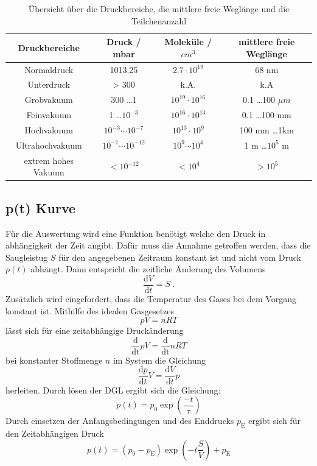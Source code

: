 \begin{table}
  \centering
  \caption{Übersicht über die Druckbereiche, die mittlere freie Weglänge und die Teilchenanzahl}
  \begin{tabular}{c|c c c}
  	\toprule
	Druckbereiche & Druck / mbar & Moleküle / $cm^3$ & mittlere freie Weglänge \\
	\midrule
	Normaldruck	& 1013.25			& $2.7 \cdot 10^{19}$ &	68 nm \\
	Unterdruck	& > 300				& k.A. & k.A \\
	Grobvakuum	& 300 \ldots 1 			&$10^{19} \cdot 10^{16}$&0.1 \ldots 100 $\mu m$ \\
	Feinvakuum	& 1 \ldots $10^{-3}$		& $10^{16} \cdot 10^{13}$ & 0.1 \ldots 100 mm \\
	Hochvakuum	& $10^{-3} \cdots 10^{-7}$	& $10^{13} \cdot 10^{9}$ & 100 mm \ldots 1km \\
	Ultrahochvakuum	& $10^{-7} \cdots 10^{-12}$	& $10^9 \cdots 10^4$ & 1 m \ldots $10^5$ m \\
	extrem hohes Vakuum & $< 10^{-12}$		& $<10^4$ & $> 10^5$ \\
	\bottomrule
  \end{tabular}
  \label{tab:ueberblick}
\end{table}
\subsection{p(t) Kurve}
Für die Auswertung wird eine Funktion benötigt welche den Druck in abhängigkeit der Zeit angibt. Dafür muss die Annahme getroffen werden, dass die Saugleistug $S$ für den angegebenen Zeitraum konstant ist und nicht vom Druck $p(t)$ abhängt. Dann entspricht die zeitliche Änderung des Volumens
\begin{equation}
  \frac{\text{d}V}{\text{d}t} = S \ .
\end{equation}
Zusätzlich wird eingefordert, dass die Temperatur des Gases bei dem Vorgang konstant ist. Mithilfe des idealen Gasgesetzes
\begin{equation}
  p V = n R T
\end{equation}
lässt sich für eine zeitabhängige Druckänderung
\begin{equation}
  \frac{\text{d}}{\text{dt}} pV = \frac{\text{d}}{\text{dt}} n R T
\end{equation}
bei konstanter Stoffmenge $n$ im System die Gleichung
\begin{equation}
  \frac{\text{d}p}{\text{d}t} V= \frac{\text{d}V}{\text{d}t} p
  \label{eqn:konti}
\end{equation}
herleiten. Durch lösen der DGL ergibt sich die Gleichung:
\begin{equation}
  p(t) = p_0 \exp \left( \frac{-t}{\tau} \right)
\end{equation}
Durch einsetzen der Anfangsbedingungen und des Enddrucks $p_\text{E}$ ergibt sich für den Zeitabhängigen Druck
\begin{equation}
  p(t) = (p_0 - p_\text{E}) \exp \left( -t \frac{S}{V} \right) + p_\text{E}
  \label{eqn:Druck}
\end{equation}
